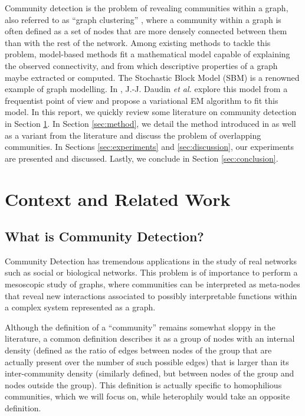 \documentclass[11pt]{article}
\begin{document}
Community detection is the problem of revealing communities within a graph, also referred to as ``graph clustering'' \cite{fortunato_community_2010}, where a community within a graph is often defined as a set of nodes that are more densely connected between them than with the rest of the network.
Among existing methods to tackle this problem, model-based methods fit a mathematical model capable of explaining the observed connectivity, and from which descriptive properties of a graph maybe extracted or computed. The Stochastic Block Model (SBM) is a renowned example of graph modelling. In \cite{main_article}, J.-J. Daudin \textit{et al.} explore this model from a frequentist point of view and propose a variational EM algorithm to fit this model. In this report, we quickly review some literature on community detection in Section \ref{sec:context}. In Section \ref{sec:method}, we detail the method introduced in \cite{main_article} as well as a variant from the literature and discuss the problem of overlapping communities. In Sections \ref{sec:experiments} and \ref{sec:discussion}, our experiments are presented and discussed. Lastly, we conclude in Section \ref{sec:conclusion}.

\section{Context and Related Work}
\label{sec:context}


\subsection{What is Community Detection?}

Community Detection has tremendous applications in the study of real networks such as social \cite{chunaev_community_2020} or biological \cite{sah_exploring_2014} networks. This problem is of importance to perform a mesoscopic study of graphs, where communities can be interpreted as meta-nodes that reveal new interactions associated to possibly interpretable functions within a complex system represented as a graph.

Although the definition of a ``community'' remains somewhat sloppy in the literature, a common definition describes it as a group of nodes with an internal density (defined as the ratio of edges between nodes of the group that are actually present over the number of such possible edges) that is larger than its inter-community density (similarly defined, but between nodes of the group and nodes outside the group). This definition is actually specific to homophilious communities, which we will focus on, while heterophily would take an opposite definition.
\end{document}
